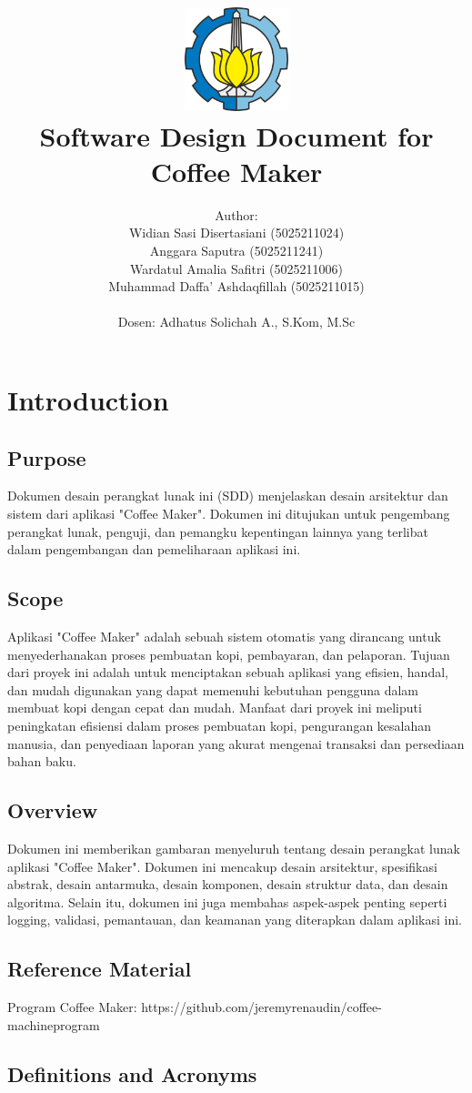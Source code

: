 \documentclass[12pt]{article}
\title{
{\includegraphics[width=3cm, height=3cm]{img/LambangITS.png}}
\\
{Software Design Document for Coffee Maker}
}
\author{Author: 
\\Widian Sasi Disertasiani (5025211024) \\
Anggara Saputra (5025211241) \\
Wardatul Amalia Safitri (5025211006) \\
Muhammad Daffa’ Ashdaqfillah (5025211015) \\  
 \\ Dosen: Adhatus Solichah A., S.Kom, M.Sc}
\begin{document}
\maketitle

\section{Introduction}
\subsection{Purpose}
Dokumen desain perangkat lunak ini (SDD) menjelaskan desain arsitektur dan sistem dari aplikasi "Coffee Maker". Dokumen ini ditujukan untuk pengembang perangkat lunak, penguji, dan pemangku kepentingan lainnya yang terlibat dalam pengembangan dan pemeliharaan aplikasi ini.


\subsection{Scope}
Aplikasi "Coffee Maker" adalah sebuah sistem otomatis yang dirancang untuk menyederhanakan proses pembuatan kopi, pembayaran, dan pelaporan. Tujuan dari proyek ini adalah untuk menciptakan sebuah aplikasi yang efisien, handal, dan mudah digunakan yang dapat memenuhi kebutuhan pengguna dalam membuat kopi dengan cepat dan mudah. Manfaat dari proyek ini meliputi peningkatan efisiensi dalam proses pembuatan kopi, pengurangan kesalahan manusia, dan penyediaan laporan yang akurat mengenai transaksi dan persediaan bahan baku.

\subsection{Overview}
Dokumen ini memberikan gambaran menyeluruh tentang desain perangkat lunak aplikasi "Coffee Maker". Dokumen ini mencakup desain arsitektur, spesifikasi abstrak, desain antarmuka, desain komponen, desain struktur data, dan desain algoritma. Selain itu, dokumen ini juga membahas aspek-aspek penting seperti logging, validasi, pemantauan, dan keamanan yang diterapkan dalam aplikasi ini.

\subsection{Reference Material}
Program Coffee Maker: https://github.com/jeremyrenaudin/coffee-machineprogram

\subsection{Definitions and Acronyms}
\end{document}
